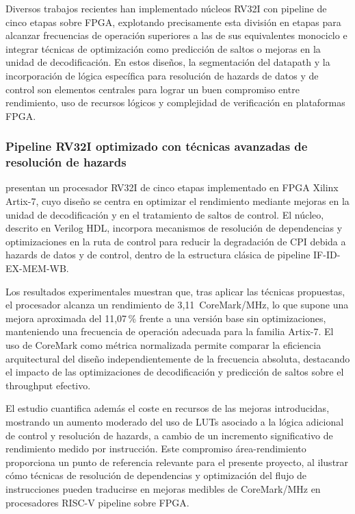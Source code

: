 Diversos trabajos recientes han implementado núcleos RV32I con pipeline de
cinco etapas sobre FPGA, explotando precisamente esta división en etapas para
alcanzar frecuencias de operación superiores a las de sus equivalentes
monociclo e integrar técnicas de optimización como predicción de saltos o
mejoras en la unidad de decodificación.\parencite{Wei2024NEORV32,Najjar2018Pipeline}
En estos diseños, la segmentación del datapath y la incorporación de lógica
específica para resolución de hazards de datos y de control son elementos
centrales para lograr un buen compromiso entre rendimiento, uso de recursos
lógicos y complejidad de verificación en plataformas FPGA.


\subsubsection{Pipeline RV32I optimizado con técnicas avanzadas
              de resolución de hazards}

\textcite{Wei2024NEORV32} presentan un procesador RV32I de cinco etapas
implementado en FPGA Xilinx Artix-7, cuyo diseño se centra en optimizar el
rendimiento mediante mejoras en la unidad de decodificación y en el
tratamiento de saltos de control.
El núcleo, descrito en Verilog HDL, incorpora mecanismos de resolución de
dependencias y optimizaciones en la ruta de control para reducir la
degradación de CPI debida a hazards de datos y de control, dentro de la
estructura clásica de pipeline IF-ID-EX-MEM-WB.

Los resultados experimentales muestran que, tras aplicar las técnicas
propuestas, el procesador alcanza un rendimiento de 3{,}11~CoreMark/MHz,
lo que supone una mejora aproximada del 11{,}07\,\% frente a una versión
base sin optimizaciones, manteniendo una frecuencia de operación adecuada
para la familia Artix-7.
El uso de CoreMark como métrica normalizada permite comparar la eficiencia
arquitectural del diseño independientemente de la frecuencia absoluta,
destacando el impacto de las optimizaciones de decodificación y predicción
de saltos sobre el throughput efectivo.

El estudio cuantifica además el coste en recursos de las mejoras introducidas,
mostrando un aumento moderado del uso de LUTs asociado a la lógica adicional
de control y resolución de hazards, a cambio de un incremento significativo
de rendimiento medido por instrucción.
Este compromiso área-rendimiento proporciona un punto de referencia relevante
para el presente proyecto, al ilustrar cómo técnicas de resolución de
dependencias y optimización del flujo de instrucciones pueden traducirse en
mejoras medibles de CoreMark/MHz en procesadores RISC-V pipeline
sobre FPGA.


